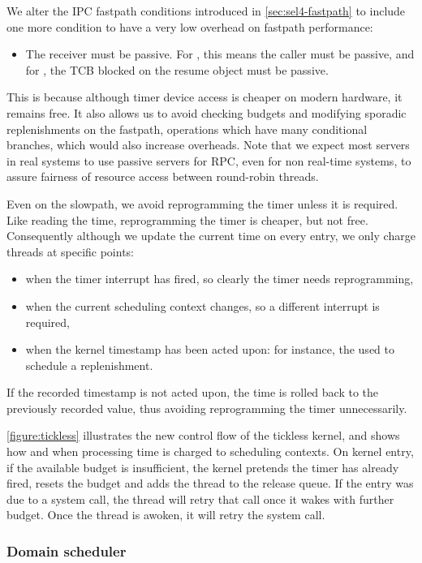 We alter the IPC fastpath conditions introduced in \cref{sec:sel4-fastpath} to include one
more condition to have a very low overhead on fastpath performance:
\begin{itemize}
    \item The receiver must be passive. For \call, this means the caller must be passive, and
          for \replyrecv, the TCB blocked on the resume object must be passive.
\end{itemize}
This is because
although timer device access is cheaper on modern hardware, it remains free. It also allows us to
avoid checking budgets and modifying sporadic replenishments on the fastpath, operations which have
many conditional branches, which would also increase overheads. Note that we expect most servers in
real systems to use passive servers for \gls{RPC}, even for non real-time systems, to assure
fairness of resource access between round-robin threads.  

Even on the slowpath, we avoid reprogramming the timer unless it is required. Like reading the time, 
reprogramming the timer is cheaper, but not free. Consequently although we update the current time
on every entry, we only charge threads at specific points:
\begin{itemize}
\item when the timer interrupt has fired, so clearly the timer needs reprogramming,
\item when the current scheduling context changes, so a different interrupt is required,
\item when the kernel timestamp has been acted upon: for instance, the used to schedule a
    replenishment.
\end{itemize}
If the recorded timestamp is not acted upon, the time is rolled back to the previously recorded value,
thus avoiding reprogramming the timer unnecessarily.

\cref{figure:tickless} illustrates the new control flow of the tickless kernel, and shows
how and when processing time is charged to scheduling contexts.
On kernel entry, if the available budget is insufficient, the kernel pretends the timer has already fired,
resets the budget and adds the thread to the release queue. If the entry was due to a system call,
the thread will retry that call once it wakes with further budget.
Once the thread is awoken, it will retry the system call.

\subsubsection{Domain scheduler}

